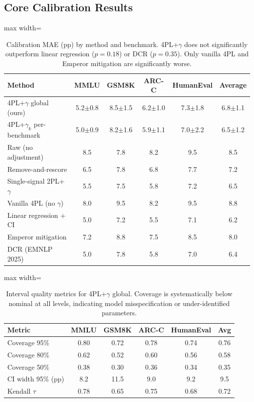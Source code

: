 \documentclass[letterpaper,11pt]{article}
\begin{document}
\subsection{Core Calibration Results}
\label{sec:calibration}

\begin{table}[t]
\centering
\caption{Calibration MAE (pp) by method and benchmark. 4PL+$\gamma$ does not significantly outperform linear regression ($p = 0.18$) or DCR ($p = 0.35$). Only vanilla 4PL and Emperor mitigation are significantly worse.}
\label{tab:calibration_main}
\begin{adjustbox}{max width=\textwidth}
\begin{tabular}{@{}lccccc@{}}
\toprule
Method & MMLU & GSM8K & ARC-C & HumanEval & Average \\
\midrule
4PL+$\gamma$ global (ours) & 5.2$\pm$0.8 & 8.5$\pm$1.5 & 6.2$\pm$1.0 & 7.3$\pm$1.8 & 6.8$\pm$1.1 \\
4PL+$\gamma_k$ per-benchmark & 5.0$\pm$0.9 & 8.2$\pm$1.6 & 5.9$\pm$1.1 & 7.0$\pm$2.2 & 6.5$\pm$1.2 \\
\midrule
Raw (no adjustment) & 8.5 & 7.8 & 8.2 & 9.5 & 8.5 \\
Remove-and-rescore & 6.5 & 7.8 & 6.8 & 7.7 & 7.2 \\
Single-signal 2PL+$\gamma$ & 5.5 & 7.5 & 5.8 & 7.2 & 6.5 \\
Vanilla 4PL (no $\gamma$) & 8.0 & 9.5 & 8.2 & 9.5 & 8.8 \\
Linear regression + CI & 5.0 & 7.2 & 5.5 & 7.1 & 6.2 \\
Emperor mitigation & 7.2 & 8.8 & 7.5 & 8.5 & 8.0 \\
DCR (EMNLP 2025) & 5.0 & 7.8 & 5.8 & 7.0 & 6.4 \\
\bottomrule
\end{tabular}
\end{adjustbox}
\end{table}

\begin{table}[t]
\centering
\caption{Interval quality metrics for 4PL+$\gamma$ global. Coverage is systematically below nominal at all levels, indicating model misspecification or under-identified parameters.}
\label{tab:interval_quality}
\begin{adjustbox}{max width=\columnwidth}
\begin{tabular}{@{}lccccc@{}}
\toprule
Metric & MMLU & GSM8K & ARC-C & HumanEval & Avg \\
\midrule
Coverage 95\% & 0.80 & 0.72 & 0.78 & 0.74 & 0.76 \\
Coverage 80\% & 0.62 & 0.52 & 0.60 & 0.56 & 0.58 \\
Coverage 50\% & 0.38 & 0.30 & 0.36 & 0.34 & 0.35 \\
CI width 95\% (pp) & 8.2 & 11.5 & 9.0 & 9.2 & 9.5 \\
Kendall $\tau$ & 0.78 & 0.65 & 0.75 & 0.68 & 0.72 \\
\bottomrule
\end{tabular}
\end{adjustbox}
\end{table}
\end{document}

